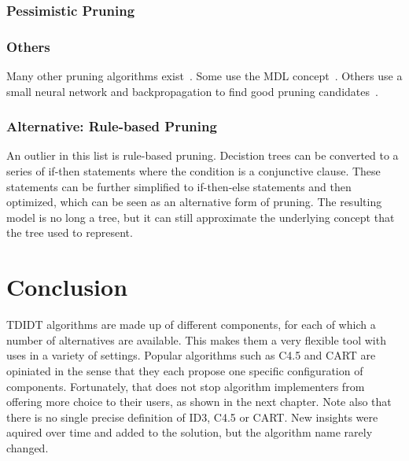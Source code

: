 \subsubsection{Pessimistic Pruning}
\cite{mansour1997pessimistic}
\cite{quinlan1987simplifying}
\cite{c45}

\subsubsection{Others}
Many other pruning algorithms exist~\cite{breslow1997simplifying, elomaa1999biases, mingers1989empirical, esposito1997comparative}. Some use the MDL concept~\cite{mdlpruning, quinlan1989inferring}. Others use a small neural network and backpropagation to find good pruning candidates~\cite{backproppruning}.

\subsubsection{Alternative: Rule-based Pruning}
An outlier in this list is rule-based pruning. Decistion trees can be converted to a series of if-then statements where the condition is a conjunctive clause. These statements can be further simplified to if-then-else statements and then optimized, which can be seen as an alternative form of pruning. The resulting model is no long a tree, but it can still approximate the underlying concept that the tree used to represent.

\section{Conclusion}
TDIDT algorithms are made up of different components, for each of which a number of alternatives are available. This makes them a very flexible tool with uses in a variety of settings. Popular algorithms such as C4.5 and CART are opiniated in the sense that they each propose one specific configuration of components. Fortunately, that does not stop algorithm implementers from offering more choice to their users, as shown in the next chapter. Note also that there is no single precise definition of ID3, C4.5 or CART. New insights were aquired over time and added to the solution, but the algorithm name rarely changed.
